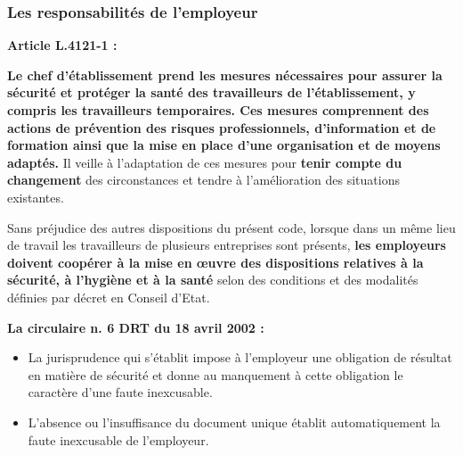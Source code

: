 \documentclass{beamer}
\begin{document}
\begin{frame}
\frametitle{Les responsabilités de l’employeur}

\textbf{Article L.4121-1 :}

\textbf{Le chef d'établissement prend les mesures nécessaires pour assurer la sécurité et protéger la santé des travailleurs de l'établissement, y compris les travailleurs temporaires. Ces mesures comprennent des actions de prévention des risques professionnels, d'information et de formation ainsi que la mise en place d'une organisation et de moyens adaptés.} Il veille à l'adaptation de ces mesures pour \textbf{tenir compte du changement} des circonstances et tendre à l'amélioration des situations existantes. 

Sans préjudice des autres dispositions du présent code, lorsque dans un même lieu de travail les travailleurs de plusieurs entreprises sont présents, \textbf{les employeurs doivent coopérer à la mise en œuvre des dispositions relatives à la sécurité, à l'hygiène et à la santé} selon des conditions et des modalités définies par décret en Conseil d'Etat.

\textbf{La circulaire n.  6 DRT du 18 avril 2002 :}

\begin{itemize}
	\item La jurisprudence qui s'établit impose à l'employeur une obligation de résultat en matière de sécurité et donne au manquement à cette obligation le caractère d'une faute inexcusable.

\item L'absence ou l'insuffisance du document unique établit automatiquement la faute inexcusable de l'employeur. 
\end{itemize}

\end{frame}
\end{document}
